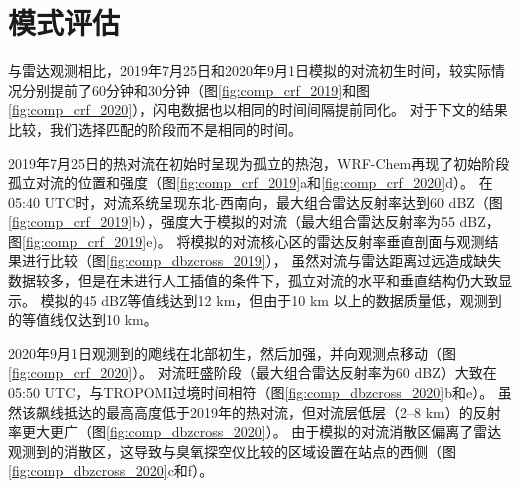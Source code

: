 \section{模式评估}

与雷达观测相比，2019年7月25日和2020年9月1日模拟的对流初生时间，较实际情况分别提前了60分钟和30分钟（图\ref{fig:comp_crf_2019}和图\ref{fig:comp_crf_2020}），闪电数据也以相同的时间间隔提前同化。
对于下文的结果比较，我们选择匹配的阶段而不是相同的时间。

2019年7月25日的热对流在初始时呈现为孤立的热泡，WRF-Chem再现了初始阶段孤立对流的位置和强度（图\ref{fig:comp_crf_2019}a和\ref{fig:comp_crf_2020}d）。
在05:40 UTC时，对流系统呈现东北-西南向，最大组合雷达反射率达到60 dBZ（图\ref{fig:comp_crf_2019}b），强度大于模拟的对流（最大组合雷达反射率为55 dBZ，图\ref{fig:comp_crf_2019}e)。
将模拟的对流核心区的雷达反射率垂直剖面与观测结果进行比较（图\ref{fig:comp_dbzcross_2019}），
虽然对流与雷达距离过远造成缺失数据较多，但是在未进行人工插值的条件下，孤立对流的水平和垂直结构仍大致显示。
模拟的45 dBZ等值线达到12 km，但由于10 km 以上的数据质量低，观测到的等值线仅达到10 km。

2020年9月1日观测到的飑线在北部初生，然后加强，并向观测点移动（图\ref{fig:comp_crf_2020}）。
对流旺盛阶段（最大组合雷达反射率为60 dBZ）大致在05:50 UTC，与TROPOMI过境时间相符（图\ref{fig:comp_dbzcross_2020}b和e）。
虽然该飙线抵达的最高高度低于2019年的热对流，但对流层低层（2--8 km）的反射率更大更广（图\ref{fig:comp_dbzcross_2020}）。
由于模拟的对流消散区偏离了雷达观测到的消散区，这导致与臭氧探空仪比较的区域设置在站点的西侧（图\ref{fig:comp_dbzcross_2020}c和f）。


